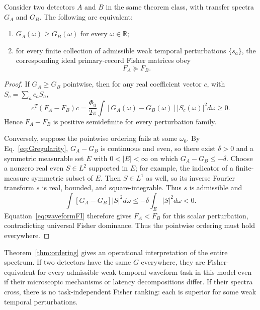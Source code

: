 \begin{theorem}
\label{thm:ordering}
Consider two detectors $A$ and $B$ in the same theorem class, with transfer spectra $G_A$ and $G_B$. The following are equivalent:
\begin{enumerate}
\item $G_A(\omega)\ge G_B(\omega)$ for every $\omega\in\mathbb R$;
\item for every finite collection of admissible weak temporal perturbations $\{s_a\}$, the corresponding ideal primary-record Fisher matrices obey
\begin{equation}
F_A\succeq F_B.
\end{equation}
\end{enumerate}
\end{theorem}

\begin{proof}
If $G_A\ge G_B$ pointwise, then for any real coefficient vector $c$, with $S_c=\sum_a c_aS_a$,
\begin{equation}
c^T(F_A-F_B)c
=\frac{\Phi_0}{2\pi}
\int [G_A(\omega)-G_B(\omega)]|S_c(\omega)|^2d\omega
\ge0.
\end{equation}
Hence $F_A-F_B$ is positive semidefinite for every perturbation family.

Conversely, suppose the pointwise ordering fails at some $\omega_0$. By Eq.~\eqref{eq:Gregularity}, $G_A-G_B$ is continuous and even, so there exist $\delta>0$ and a symmetric measurable set $E$ with $0<|E|<\infty$ on which $G_A-G_B\le-\delta$. Choose a nonzero real even $S\in L^2$ supported in $E$; for example, the indicator of a finite-measure symmetric subset of $E$. Then $S\in L^1$ as well, so its inverse Fourier transform $s$ is real, bounded, and square-integrable. Thus $s$ is admissible and
\begin{equation}
\int [G_A-G_B]|S|^2d\omega
\le-\delta\int_E|S|^2d\omega<0.
\end{equation}
Equation~\eqref{eq:waveformFI} therefore gives $F_A<F_B$ for this scalar perturbation, contradicting universal Fisher dominance. Thus the pointwise ordering must hold everywhere.
\end{proof}

Theorem~\ref{thm:ordering} gives an operational interpretation of the entire spectrum. If two detectors have the same $G$ everywhere, they are Fisher-equivalent for every admissible weak temporal waveform task in this model even if their microscopic mechanisms or latency decompositions differ. If their spectra cross, there is no task-independent Fisher ranking: each is superior for some weak temporal perturbations.

